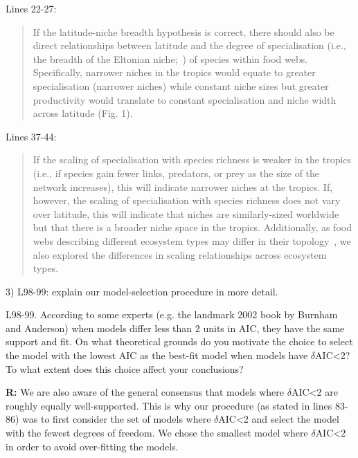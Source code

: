 \documentclass[12pt]{letter}
\newenvironment{refquote}{\bigskip \begin{it}}{\end{it}\smallskip}
\begin{document}
  Lines 22-27:

  \begin{quotation}

    If the latitude-niche breadth hypothesis is correct, 
    there should also be direct relationships between 
    latitude and the degree of specialisation (i.e., the 
    breadth of the Eltonian 
    niche;~\cite{Elton1927,Leibold2010}) of species within
    food webs. Specifically, narrower niches in the tropics 
    would equate to greater specialisation (narrower niches) 
    while constant niche sizes but greater productivity 
    would translate to constant specialisation and niche 
    width across latitude (Fig. 1). 

  \end{quotation}


  Lines 37-44:

  \begin{quotation}

    If the scaling of specialisation with species richness 
    is weaker in the  tropics (i.e., if species gain fewer
    links, predators, or prey as the size  of the network
    increases), this will indicate narrower niches at the 
    tropics.  If, however, the scaling of specialisation 
    with species richness does not vary over latitude, this 
    will indicate that niches are similarly-sized worldwide 
    but that there is a broader niche space in the tropics. 
    Additionally, as food webs describing different 
    ecosystem types may differ in their 
    topology~\cite{Dunne2004,Shurin2006}, we also explored 
    the differences in scaling relationships across 
    ecosystem types.

  \end{quotation}


  3) L98-99: explain our model-selection procedure in more detail.

  \begin{refquote}

    L98-99. According to some experts (e.g. the landmark 2002 book by Burnham
    and Anderson) when models differ less than 2 units in AIC, they have the
    same support and fit. On what theoretical grounds do you motivate the
    choice to select the model with the lowest AIC as the best-fit model when
    models have $\delta$AIC\textless2? To what extent does this choice affect your
    conclusions?

  \end{refquote}

  \textbf{R:} We are also aware of the general consensus    that models where
  $\delta$AIC\textless2 are roughly equally well-supported. This is why our
  procedure (as stated in lines 83-86) was to first consider the set of models
  where $\delta$AIC\textless2 and select the model with the fewest degrees of
  freedom. We chose the smallest model where $\delta$AIC\textless2 in order to
  avoid over-fitting the models. 
\end{document}
